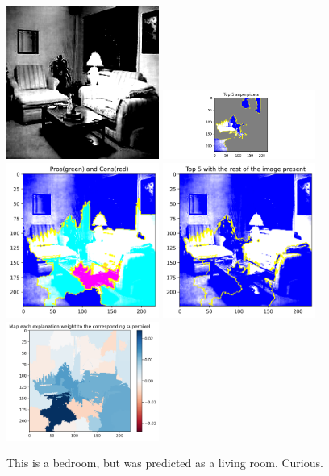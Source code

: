 \begin{figure}[h]
    \centering
    \includegraphics[width=5cm]{bedroom-should-living-room.png}
    \includegraphics[width=5cm]{lime-bedroom-should-living-room.png}
    \includegraphics[width=5cm]{procon-bedroom-should-living-room.png}
    \includegraphics[width=5cm]{top5-bedroom-should-living-room.png}
    \includegraphics[width=5cm]{weight-bedroom-should-living-room.png}
    \caption{This is a bedroom, but was predicted as a living room.  Curious.}
    \label{fig:result1}
\end{figure}

